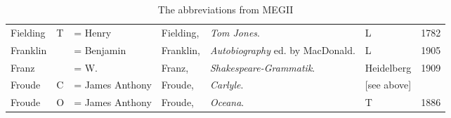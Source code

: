 \begin{sidewaystable}
\begin{tabular}{p{} p{} p{} p{} p{} p{} p{}}
Fielding & T & = Henry & Fielding, & \textit{Tom Jones}. & L & 1782 \\
Franklin & & = Benjamin & Franklin, & \textit{Autobiography} ed. by MacDonald. & L & 1905 \\
Franz & & = W. & Franz, & \textit{Shakespeare-Grammatik}. & Heidelberg & 1909 \\
Froude & C & = James Anthony & Froude, & \textit{Carlyle}. & [see above] & \\
Froude & O & = James Anthony & Froude, & \textit{Oceana}. & T & 1886 \\
\end{tabular}
\caption{The abbreviations from MEGII}
\label{tab:MEG-abbreviations}
\end{sidewaystable}
